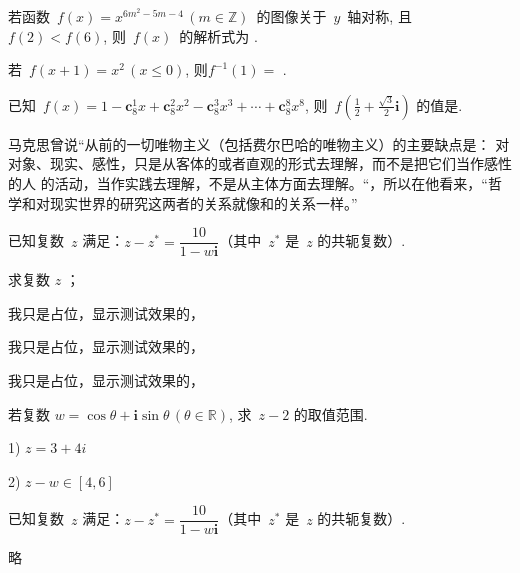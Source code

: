 \documentclass[a4paper, zihao = 5, unicodeGBMath, %
]{ctexart}
\begin{document}

\begin{qus}
  
\item 若函数~$f(x)=x^{6m^2-5m-4}\,(m\in\mathbb{Z})$~的图像关于~$y$~轴对称,
  且~$f(2)<f(6)$, 则~$f(x)$~的解析式为 .

\item 若~$f(x+1)=x^2\,(x\leq0)$, 则$f^{-1}(1)=$ .

\item 已知~$f(x)=1-\textbf{c}_8^1x+\textbf{c}_8^2x^2-\textbf{c}_8^3x^3+\cdots+\textbf{c}_8^8x^8$,
  则~$f\left(\tfrac{1}{2}+\tfrac{\sqrt{3}}{2}\textbf{i}\right)$ 的值是.

\item 马克思曾说“从前的一切唯物主义（包括费尔巴哈的唯物主义）的主要缺点是：
  对对象、现实、感性，只是从客体的或者直观的形式去理解，而不是把它们当作感性的人
  的活动，当作实践去理解，不是从主体方面去理解。“，所以在他看来，“哲学和对现实世界的研究这两者的关系就像和的关系一样。”

\end{qus}

\clearpage


\begin{qus}
  
\item 已知复数~$z$ 满足：${z}-z^*=\dfrac{10}{1-w\textbf{i}}$（其中~$z^*$
  是~$z$ 的共轭复数）.

  \begin{qus}
  \item 求复数 $z$ ；
    \begin{qus}
    \item 我只是占位，显示测试效果的，
    \item 我只是占位，显示测试效果的，
    \item 我只是占位，显示测试效果的，
    \end{qus}
  \item 若复数 $w=\cos\theta+\textbf{i}\sin\theta\,(\theta\in\mathbb{R})$, 求~${z-2}$ 的取值范围.
  \end{qus}

  \begin{solution}[5cm]
    1) $z=3+4\check{}{i}$

    2) ${z-w}\in[4,6]$
  \end{solution}

  \item 已知复数~$z$ 满足：${z}-z^*=\dfrac{10}{1-w\textbf{i}}$（其中~$z^*$
    是~$z$ 的共轭复数）.
    \begin{solution}
      略
    \end{solution}
  \end{qus}
\end{document}
